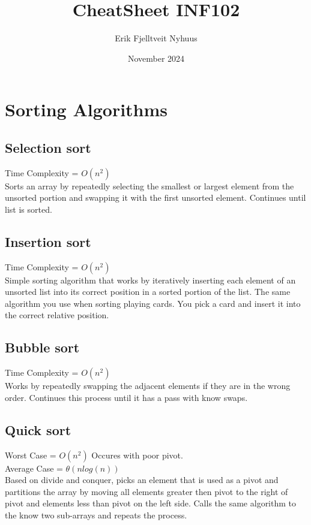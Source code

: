 \documentclass{article}
\title{CheatSheet INF102}
\author{Erik Fjelltveit Nyhuus}
\date{November 2024}
\begin{document}
\maketitle

\tableofcontents

\newpage


\section{Sorting Algorithms}
\subsection{Selection sort}
Time Complexity = $O(n^2)$\\
Sorts an array by repeatedly selecting the smallest or largest element from the unsorted portion
and swapping it with the first unsorted element. Continues until list is sorted.
\subsection{Insertion sort}
Time Complexity = $O(n^2)$\\
Simple sorting algorithm that works by iteratively inserting each element of an unsorted list into its correct 
position in a sorted portion of the list. The same algorithm you use when sorting playing cards. 
You pick a card and insert it into the correct relative position. 
\subsection{Bubble sort}
Time Complexity = $O(n^2)$\\
Works by repeatedly swapping the adjacent elements if they are in the wrong order. Continues 
this process until it has a pass with know swaps.
\subsection{Quick sort}
Worst Case = $O(n^2)$ Occures with poor pivot.\\ 
Average Case = $\theta(nlog(n))$\\
Based on divide and conquer, picks an element that is used as a pivot and partitions the array by moving all elements
greater then pivot to the right of pivot and elements less than pivot on the left side. Calls the same algorithm to the know two sub-arrays and repeats the process.
\end{document}
